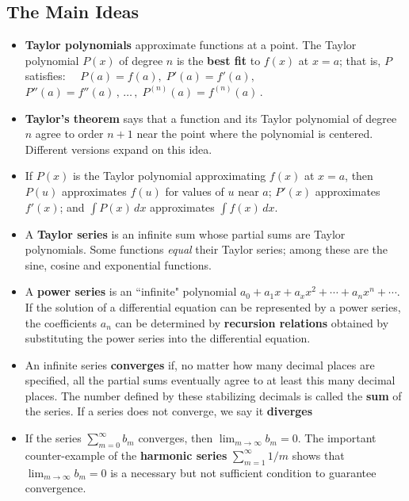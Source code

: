 {{{{\subsection{The Main Ideas}

\begin{itemize}

\item  {\bf Taylor polynomials} approximate functions at a point.  The Taylor polynomial $P(x)$ of degree $n$  is the {\bf best fit} to $f(x)$ at $x=a$; that is, $P$ satisfies:  $\quad P(a)=f(a),\;  P'(a)=f'(a),$ 
\newline
\noindent
 $P''(a)=f''(a) \, , \, \ldots \, , \; P^{(n)}(a)=f^{(n)}(a)\, .$

\item {\bf Taylor's theorem} says that a function and its Taylor
  polynomial of degree $n$ agree to order $n + 1$ near the point where
  the polynomial is centered.  Different versions expand on this idea.

\item If $P(x)$ is the Taylor polynomial approximating $f(x)$ at $x=a$, then $P(u)$
  approximates $f(u)$ for values of $u$ near $a$; $P'(x)$ approximates $f'(x)$; and $\int \! P(x)
  \, dx$ approximates $\int \! f(x) \, dx$.

\item  A {\bf Taylor series} is an infinite sum whose partial sums are Taylor polynomials.  Some functions {\em equal} their Taylor series;  among these are the sine, cosine and exponential functions.

\item  A {\bf power series} is an ``infinite" polynomial
$a_0 + a_1x + a_x x^2 + \cdots + a_n x^n + \cdots .$  
If the solution of a differential equation can be represented by a power series, the coefficients $a_n$ can be determined by {\bf recursion relations} obtained by substituting the power series into the differential equation.

\item  An infinite series {\bf converges} if, no matter how many decimal places are specified, all the partial sums eventually agree to at least this many decimal places.  The number defined by these stabilizing decimals is called the {\bf sum} of the series.  If a series does not converge, we say it {\bf diverges}

\item  If the series $\sum_{m=0}^\infty b_m$ converges, then $\lim_{m \to \infty} b_m=0$.  The important counter-example of the {\bf harmonic series} $\sum_{m=1}^{\infty} 1/m$ shows that $\lim_{m \to \infty} b_m = 0$ is a necessary but not sufficient condition to guarantee convergence.


\end{itemize}}}}}
